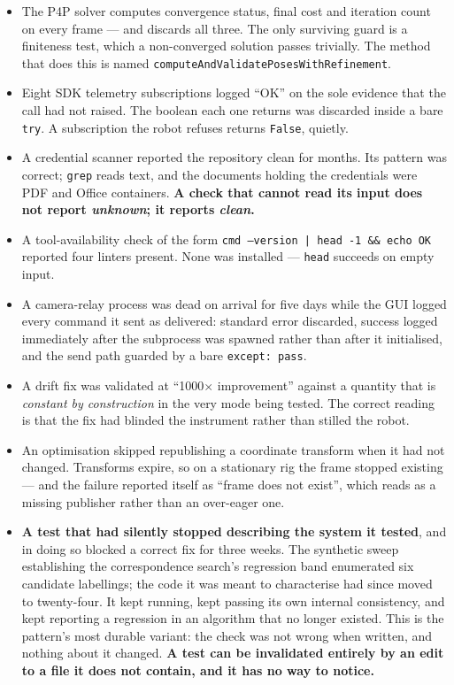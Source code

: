 \documentclass[11pt]{article}
\begin{document}
\begin{itemize}
  \item The P4P solver computes convergence status, final cost and
  iteration count on every frame --- and discards all three. The only
  surviving guard is a finiteness test, which a non-converged solution
  passes trivially. The method that does this is named
  \texttt{computeAndValidatePosesWithRefinement}.

  \item Eight SDK telemetry subscriptions logged ``OK'' on the sole evidence
  that the call had not raised. The boolean each one returns was discarded
  inside a bare \texttt{try}. A subscription the robot refuses returns
  \texttt{False}, quietly.

  \item A credential scanner reported the repository clean for months. Its
  pattern was correct; \texttt{grep} reads text, and the documents holding
  the credentials were PDF and Office containers. \textbf{A check that
  cannot read its input does not report \emph{unknown}; it reports
  \emph{clean}.}

  \item A tool-availability check of the form
  \texttt{cmd --version | head -1 \&\& echo OK} reported four linters
  present. None was installed --- \texttt{head} succeeds on empty input.

  \item A camera-relay process was dead on arrival for five days while the
  GUI logged every command it sent as delivered: standard error discarded,
  success logged immediately after the subprocess was spawned rather than
  after it initialised, and the send path guarded by a bare
  \texttt{except: pass}.

  \item A drift fix was validated at ``1000$\times$ improvement'' against a
  quantity that is \emph{constant by construction} in the very mode being
  tested. The correct reading is that the fix had blinded the instrument
  rather than stilled the robot.

  \item An optimisation skipped republishing a coordinate transform when it
  had not changed. Transforms expire, so on a stationary rig the frame
  stopped existing --- and the failure reported itself as
  ``frame does not exist'', which reads as a missing publisher rather than
  an over-eager one.

  \item \textbf{A test that had silently stopped describing the system it
  tested}, and in doing so blocked a correct fix for three weeks. The
  synthetic sweep establishing the correspondence search's regression band
  enumerated six candidate labellings; the code it was meant to characterise
  had since moved to twenty-four. It kept running, kept passing its own
  internal consistency, and kept reporting a regression in an algorithm that
  no longer existed. This is the pattern's most durable variant: the check
  was not wrong when written, and nothing about it changed. \textbf{A test
  can be invalidated entirely by an edit to a file it does not contain, and
  it has no way to notice.}
\end{itemize}
\end{document}

